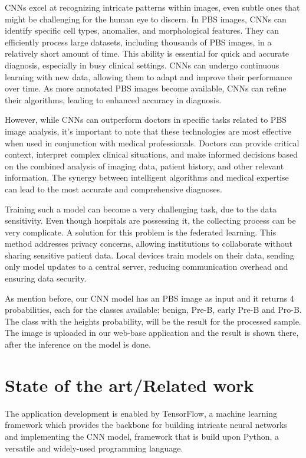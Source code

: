 \documentclass[runningheads,a4paper,11pt]{report}
\begin{document}
CNNs excel at recognizing intricate patterns within images, even subtle ones that might be challenging for the human eye to discern. In PBS images, CNNs can identify specific cell types, anomalies, and morphological features. They can efficiently process large datasets, including thousands of PBS images, in a relatively short amount of time. This ability is essential for quick and accurate diagnosis, especially in busy clinical settings. CNNs can undergo continuous learning with new data, allowing them to adapt and improve their performance over time. As more annotated PBS images become available, CNNs can refine their algorithms, leading to enhanced accuracy in diagnosis.

However, while CNNs can outperform doctors in specific tasks related to PBS image analysis, it's important to note that these technologies are most effective when used in conjunction with medical professionals. Doctors can provide critical context, interpret complex clinical situations, and make informed decisions based on the combined analysis of imaging data, patient history, and other relevant information. The synergy between intelligent algorithms and medical expertise can lead to the most accurate and comprehensive diagnoses.

Training such a model can become a very challenging task, due to the data sensitivity. Even though hospitals are possessing it, the collecting process can be very complicate. A solution for this problem is the federated learning. This method addresses privacy concerns, allowing institutions to collaborate without sharing sensitive patient data. Local devices train models on their data, sending only model updates to a central server, reducing communication overhead and ensuring data security.

As mention before, our CNN model has an PBS image as input and it returns 4 probabilities, each for the classes available: benign, Pre-B, early Pre-B and Pro-B. The class with the heights probability, will be the result for the processed sample. The image is uploaded in our web-base application and the result is shown there, after the inference on the model is done.



\chapter{State of the art/Related work}
\label{chapter:stateOfArt}

The application development is enabled by TensorFlow, a machine learning framework which provides the backbone for building intricate neural networks and implementing the CNN model, framework that is build upon Python, a versatile and widely-used programming language. 
\end{document}
